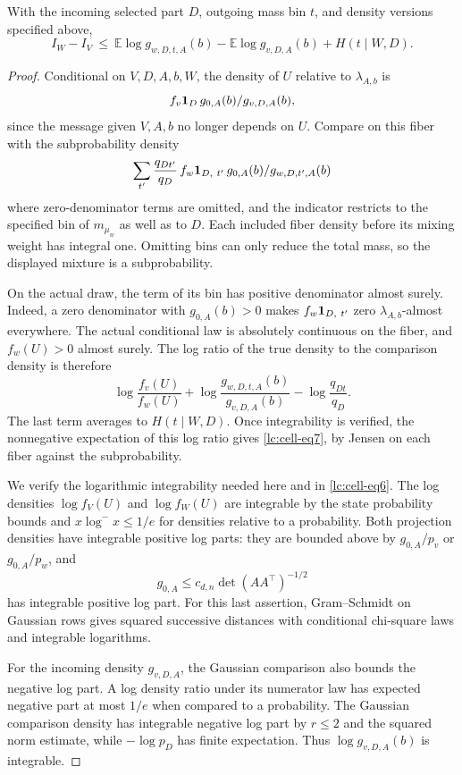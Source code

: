 \begin{lemma}\label{lc:cell-fiber-comparison}
With the incoming selected part \(D\), outgoing mass bin \(t\), and density versions specified above,
\begin{equation}\label{lc:cell-eq7}
I_W-I_V
 \ \le\ \mathbb E\log g_{w,D,t,A}(b) - \mathbb E\log g_{v,D,A}(b)
       + H(t\mid W,D).
\end{equation}
\end{lemma}
\begin{proof}
Conditional on \(V,D,A,b,W\), the density of \(U\) relative to \(\lambda_{A,b}\) is
\[
 f_v{\bf 1}_D\, g_{0,A}(b)/g_{v,D,A}(b),
\]
since the message given \(V,A,b\) no longer depends on \(U\). Compare on this fiber with the subprobability density
\[
 \sum_{t'} \frac{q_{Dt'}}{q_D}\,
   f_w{\bf 1}_{D,\ t'}\, g_{0,A}(b)/g_{w,D,t',A}(b)
\]
where zero-denominator terms are omitted, and the indicator restricts
to the specified bin of \(m_{\mu_w}\) as well as to \(D\).
Each included fiber density before its mixing weight has integral
one. Omitting bins can only reduce the total mass, so the displayed
mixture is a subprobability.

On the actual draw, the term of its bin has positive denominator
almost surely. Indeed, a zero denominator with \(g_{0,A}(b)>0\)
makes \(f_w{\bf 1}_{D,\ t'}\) zero \(\lambda_{A,b}\)-almost everywhere.
The actual conditional law is absolutely continuous on the fiber,
and \(f_w(U)>0\) almost surely. The log ratio of the true density
to the comparison density is therefore
\[
 \log\frac{f_v(U)}{f_w(U)}
 +\log\frac{g_{w,D,t,A}(b)}{g_{v,D,A}(b)}
 -\log\frac{q_{Dt}}{q_D}.
\]
The last term averages to \(H(t\mid W,D)\). Once integrability is
verified, the nonnegative expectation of this log ratio gives
\eqref{lc:cell-eq7}, by Jensen on each fiber against the subprobability.

We verify the logarithmic integrability needed here and in
\eqref{lc:cell-eq6}. The log densities
\(\log f_V(U)\) and \(\log f_W(U)\) are integrable by the state probability
bounds and \(x\log^-x\le1/e\) for densities relative to a probability.
Both projection densities have integrable positive log parts: they
are bounded above by \(g_{0,A}/p_v\) or \(g_{0,A}/p_w\), and
\[
 g_{0,A}\le c_{d,n}\det(AA^\top)^{-1/2}
\]
has integrable positive log part. For this last assertion,
Gram--Schmidt on Gaussian rows gives squared successive distances
with conditional chi-square laws and integrable logarithms.

For the incoming density \(g_{v,D,A}\), the Gaussian comparison also
bounds the negative log part. A log density ratio under its numerator
law has expected negative part at most \(1/e\) when compared to a
probability. The Gaussian comparison density has integrable negative
log part by \(r\le2\) and the squared norm estimate, while
\(-\log p_D\) has finite expectation. Thus
\(\log g_{v,D,A}(b)\) is integrable.


\end{proof}
